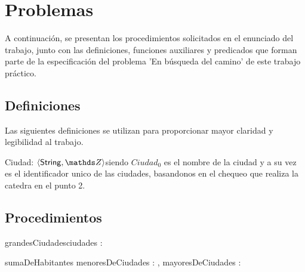 \documentclass[10pt,a4paper]{article}
\newcommand{\ciudad}{\ensuremath{\langle \mathsf{String} , \ent \rangle}}
\begin{document}
\maketitle

\section{Problemas}
A continuación, se presentan los procedimientos solicitados en el enunciado del trabajo, junto con las definiciones, funciones auxiliares y predicados que forman parte de la especificación del problema 'En búsqueda del camino' de este trabajo práctico.

\subsection{Definiciones}
Las siguientes definiciones se utilizan para proporcionar mayor claridad y legibilidad al trabajo.

Ciudad:  \ciudad  \quad siendo $Ciudad_0$ es el nombre de la ciudad y a su vez es el identificador unico de las ciudades, basandonos en el chequeo que realiza la catedra en el punto 2.


\subsection{Procedimientos}


\begin{proc}{grandesCiudades}{\In ciudades : }{ }
\end{proc}

\begin{proc}{sumaDeHabitantes}
	{\In menoresDeCiudades : , \In mayoresDeCiudades : }{ }

\end{proc}
\end{document}
